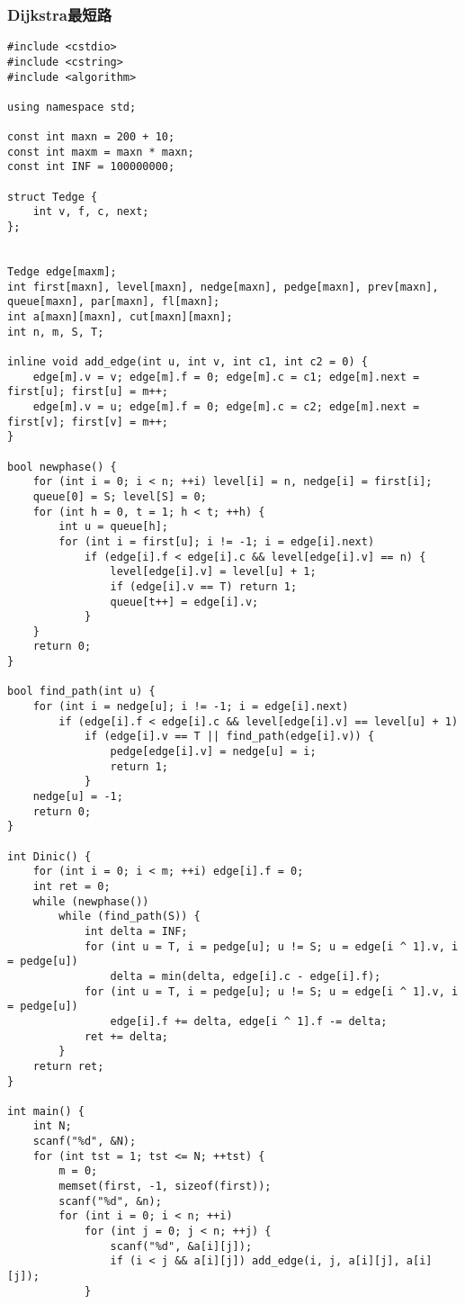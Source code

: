 \subsubsection{Dijkstra最短路}
\begin{verbatim}
#include <cstdio>
#include <cstring>
#include <algorithm>

using namespace std;

const int maxn = 200 + 10;
const int maxm = maxn * maxn;
const int INF = 100000000;

struct Tedge {
	int v, f, c, next;
};


Tedge edge[maxm];
int first[maxn], level[maxn], nedge[maxn], pedge[maxn], prev[maxn], queue[maxn], par[maxn], fl[maxn];
int a[maxn][maxn], cut[maxn][maxn];
int n, m, S, T;

inline void add_edge(int u, int v, int c1, int c2 = 0) {
	edge[m].v = v; edge[m].f = 0; edge[m].c = c1; edge[m].next = first[u]; first[u] = m++;
	edge[m].v = u; edge[m].f = 0; edge[m].c = c2; edge[m].next = first[v]; first[v] = m++;
}

bool newphase() {
	for (int i = 0; i < n; ++i) level[i] = n, nedge[i] = first[i];
	queue[0] = S; level[S] = 0;
	for (int h = 0, t = 1; h < t; ++h) {
		int u = queue[h];
		for (int i = first[u]; i != -1; i = edge[i].next)
			if (edge[i].f < edge[i].c && level[edge[i].v] == n) {
				level[edge[i].v] = level[u] + 1;
				if (edge[i].v == T) return 1;
				queue[t++] = edge[i].v;
			}
	}
	return 0;
}

bool find_path(int u) {
	for (int i = nedge[u]; i != -1; i = edge[i].next)
		if (edge[i].f < edge[i].c && level[edge[i].v] == level[u] + 1)
			if (edge[i].v == T || find_path(edge[i].v)) {
				pedge[edge[i].v] = nedge[u] = i;
				return 1;
			}
	nedge[u] = -1;
	return 0;
}

int Dinic() {
	for (int i = 0; i < m; ++i) edge[i].f = 0;
	int ret = 0;
	while (newphase())
		while (find_path(S)) {
			int delta = INF;
			for (int u = T, i = pedge[u]; u != S; u = edge[i ^ 1].v, i = pedge[u])
				delta = min(delta, edge[i].c - edge[i].f);
			for (int u = T, i = pedge[u]; u != S; u = edge[i ^ 1].v, i = pedge[u])
				edge[i].f += delta, edge[i ^ 1].f -= delta;
			ret += delta;
		}
	return ret;
}

int main() {
	int N;
	scanf("%d", &N);
	for (int tst = 1; tst <= N; ++tst) {
		m = 0;
		memset(first, -1, sizeof(first));
		scanf("%d", &n);
		for (int i = 0; i < n; ++i)
			for (int j = 0; j < n; ++j) {
				scanf("%d", &a[i][j]);
				if (i < j && a[i][j]) add_edge(i, j, a[i][j], a[i][j]);
			}


\end{verbatim}
